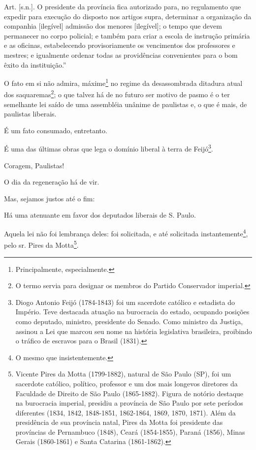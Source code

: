Art. {[}s.n.{]}. O presidente da província fica autorizado para, no
regulamento que expedir para execução do disposto nos artigos supra,
determinar a organização da companhia {[}ilegível{]} admissão dos
menores {[}ilegível{]}; o tempo que devem permanecer no corpo policial;
e também para criar a escola de instrução primária e as oficinas,
estabelecendo provisoriamente os vencimentos dos professores e mestres;
e igualmente ordenar todas as providências convenientes para o bom êxito
da instituição.''

O fato em si não admira, máxime\footnote{Principalmente,
  especialmente.} no regime da desassombrada ditadura atual dos
saquaremas\footnote{O termo servia para designar os membros do Partido
  Conservador imperial.}; o que talvez há de no futuro ser motivo de
pasmo é o ter semelhante lei saído de uma assembléia unânime de
paulistas e, o que é mais, de paulistas liberais.

É um fato consumado, entretanto.

É uma das últimas obras que lega o domínio liberal à terra de
Feijó\footnote{Diogo Antonio Feijó (1784-1843) foi um sacerdote
  católico e estadista do Império. Teve destacada atuação na burocracia
  do estado, ocupando posições como deputado, ministro, presidente do
  Senado. Como ministro da Justiça, assinou a Lei que marcou seu nome na
  história legislativa brasileira, proibindo o tráfico de escravos para
  o Brasil (1831).}.

Coragem, Paulistas!

O dia da regeneração há de vir.

\noindent\dotfill

Mas, sejamos justos até o fim:

Há uma atenuante em favor dos deputados liberais de S. Paulo.

Aquela lei não foi lembrança deles: foi solicitada, e até solicitada
instantemente\footnote{O mesmo que insistentemente.}, pelo sr. Pires
da Motta\footnote{Vicente Pires da Motta (1799-1882), natural de São
  Paulo (SP), foi um sacerdote católico, político, professor e um dos
  mais longevos diretores da Faculdade de Direito de São Paulo
  (1865-1882). Figura de notório destaque na burocracia imperial,
  presidiu a província de São Paulo por sete períodos diferentes (1834,
  1842, 1848-1851, 1862-1864, 1869, 1870, 1871). Além da presidência de
  sua província natal, Pires da Motta foi presidente das províncias de
  Pernambuco (1848), Ceará (1854-1855), Paraná (1856), Minas Gerais
  (1860-1861) e Santa Catarina (1861-1862).}.

